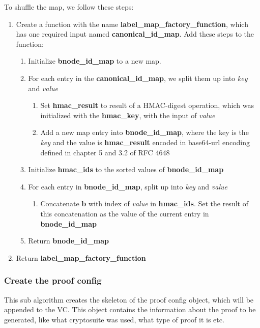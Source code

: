 \documentclass[
	a4paper               %
	,BCOR=0mm            %
	,bibliography=totoc   %
	,listof=totoc         %
	,monolingual
	,twoside=false
]{bfhthesis}              %
\begin{document}
To shuffle the map, we follow these steps:
\begin{enumerate}
	\item Create a function with the name \textbf{label\_map\_factory\_function}, which has one required input named \textbf{canonical\_id\_map}. Add these steps to the function:
	\begin{enumerate}
		\item Initialize \textbf{bnode\_id\_map} to a new map.
		\item For each entry in the \textbf{canonical\_id\_map}, we split them up into \textit{key} and \textit{value}
		\begin{enumerate}
			\item Set \textbf{hmac\_result} to result of a HMAC-digest operation, which was initialized with the \textbf{hmac\_key}, with the input of \textit{value}
			\item Add a new map entry into \textbf{bnode\_id\_map}, where the key is the \textit{key} and the value is \textbf{hmac\_result} encoded in base64-url encoding defined in chapter 5 and 3.2 of RFC 4648\cite{base64}
		\end{enumerate}
		\item Initialize \textbf{hmac\_ids} to the sorted values of \textbf{bnode\_id\_map}
		\item For each entry in \textbf{bnode\_id\_map}, split up into \textit{key} and \textit{value}
		\begin{enumerate}
			\item Concatenate \textbf{b} with index of \textit{value} in \textbf{hmac\_ids}. Set the result of this concatenation as the value of the current entry in \textbf{bnode\_id\_map}
		\end{enumerate}
		\item Return \textbf{bnode\_id\_map}
	\end{enumerate}
	\item Return \textbf{label\_map\_factory\_function}
\end{enumerate}

\subsubsection{Create the proof config}
\label{subsec:proof_config}
This sub algorithm creates the skeleton of the proof config object, which will be appended to the VC.
This object contains the information about the proof to be generated, like what cryptosuite was used, what type of proof it is etc.\\
\end{document}
